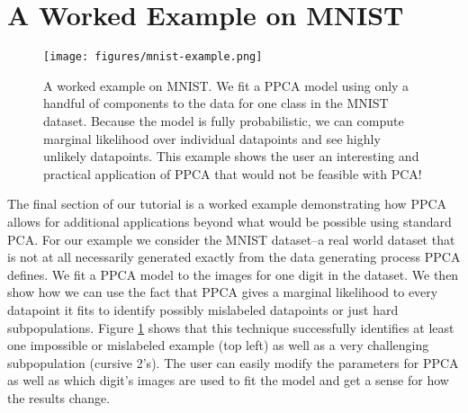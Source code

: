 \section{A Worked Example on MNIST}
\begin{figure}[!h]
    \centering
    \texttt{[image: figures/mnist-example.png]}
    \caption{A worked example on MNIST. We fit a PPCA model using only a handful of components to the data for one class in the MNIST dataset. Because the model is fully probabilistic, we can compute marginal likelihood over individual datapoints and see highly unlikely datapoints. This example shows the user an interesting and practical application of PPCA that would not be feasible with PCA!}
    \label{fig:mnist}
\end{figure}
The final section of our tutorial is a worked example demonstrating how PPCA allows for additional applications beyond what would be possible using standard PCA. For our example we consider the MNIST dataset--a real world dataset that is not at all necessarily generated exactly from the data generating process PPCA defines. We fit a PPCA model to the images for one digit in the dataset. We then show how we can use the fact that PPCA gives a marginal likelihood to every datapoint it fits to identify possibly mislabeled datapoints or just hard subpopulations. Figure \ref{fig:mnist} shows that this technique successfully identifies at least one impossible or mislabeled example (top left) as well as a very challenging subpopulation (cursive 2's). The user can easily modify the parameters for PPCA as well as which digit's images are used to fit the model and get a sense for how the results change. 